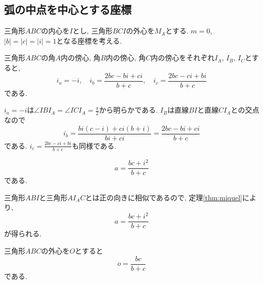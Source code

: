 \subsection{弧の中点を中心とする座標}
\begin{bset}
三角形$ABC$の内心を$I$とし, 三角形$BCI$の外心を$M_A$とする.
$m=0$, $\lvert b\rvert=\lvert c\rvert=\lvert i\rvert=1$となる座標を考える.
\end{bset}
%
\begin{bthm}
三角形$ABC$の角$A$内の傍心, 角$B$内の傍心, 角$C$内の傍心をそれぞれ$I_A$, $I_B$, $I_C$とすると,
\[i_a=-i,\quad i_b=\frac{2bc-bi+ci}{b+c},\quad i_c=\frac{2bc-ci+bi}{b+c}\]
である.
\end{bthm}
\begin{prf*}
$i_a=-i$は$\angle IBI_A=\angle ICI_A=\frac{\pi}{2}$から明らかである.
$I_B$は直線$BI$と直線$CI_A$との交点なので
\[i_b=\frac{bi(c-i)+ci(b+i)}{bi+ci}=\frac{2bc-bi+ci}{b+c}\]
である.
$i_c=\frac{2bc-ci+bi}{b+c}$も同様である.
\end{prf*}
%
\begin{bthm}\label{thm:a-m}
\begin{equation}
a=\frac{bc+i^2}{b+c}
\end{equation}
である.
\end{bthm}
\begin{prf*}
三角形$ABI$と三角形$AI_AC$とは正の向きに相似であるので, 定理\ref{thm:miquel}により,
\[a=\frac{bc+i^2}{b+c}\]
が得られる.
\end{prf*}
%
\begin{bthm}
三角形$ABC$の外心を$O$とすると
\[o=\frac{bc}{b+c}\]
である.
\end{bthm}
